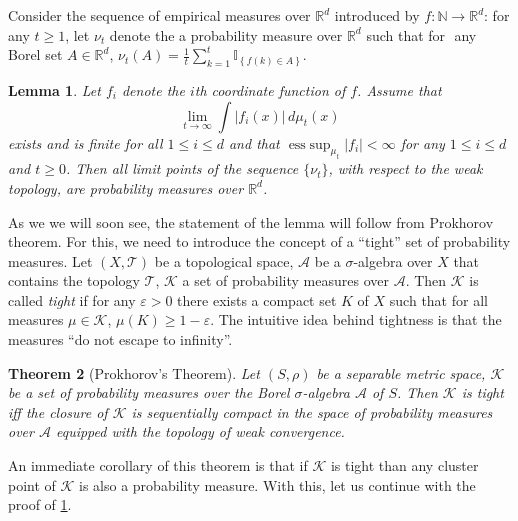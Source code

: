 \documentclass[english]{article} %
\DeclareMathOperator{\esssup}{ess\;sup}
\newcommand{\ind}[1]{\mathbb{I}_{\left\{ #1 \right\}}}
\newcommand{\real}{\mathbb{R}}
\renewcommand{\natural}{\mathbb{N}}
\newtheorem{lemma}{Lemma}[section]
\newtheorem{thm}[lemma]{Theorem}
\theoremstyle{definition}
\begin{document}
Consider the sequence of empirical measures over $\real^d$ introduced by $f:\natural \rightarrow \real^d$: for any $t\ge 1$, let $\nu_t$ denote the a probability measure over $\real^d$ such that
for $ $ any Borel set $A \in \real^d$, $\nu_t(A)=\tfrac{1}{t} \sum_{k=1}^t \ind{f(k) \in A}$. 
\fi

\begin{lemma}
\label{lem:nicefunction}
Let $f_i$ denote the $i$th coordinate function of $f$.
Assume that
\begin{equation}
\label{eq:niceproperty}
\lim_{t\to\infty} \int |f_i(x)|\, d\mu_t(x) 
\end{equation}
exists and is finite for all $1 \le i \le d$ and that $\esssup_{\mu_t} |f_i|<\infty$ for any $1\le i \le d$ and $t\ge 0$.
Then all limit points of the sequence $\{\nu_t\}$, with respect to the weak topology, are probability measures over $\real^d$.
\end{lemma}
\newcommand{\TT}{\mathcal{T}}
\renewcommand{\AA}{\mathcal{A}}
\newcommand{\KK}{\mathcal{K}}
\newcommand{\eps}{\varepsilon}
As we we will soon see, the statement of the lemma will follow from Prokhorov theorem.
For this, we need to introduce the concept of a ``tight'' set of probability measures.
Let $(X,\TT)$ be a topological space, $\AA$ be a $\sigma$-algebra over $X$ that contains the topology $\TT$,
$\KK$ a set of probability measures over $\AA$. Then $\KK$ is called \emph{tight} if for any $\eps>0$ there exists a compact set $K$ of $X$ such that for all measures $\mu \in \KK$, $\mu(K)\ge 1-\eps$. The intuitive idea behind tightness is that the measures ``do not escape to infinity''.
\begin{thm}[Prokhorov's Theorem]
Let $(S,\rho)$ be a separable metric space, $\KK$ be a set of probability measures over the Borel $\sigma$-algebra $\AA$ of $S$.
Then $\KK$ is tight iff the closure of $\KK$ is sequentially compact in the space of probability measures over $\AA$ equipped with the topology of weak convergence.
\end{thm}
An immediate corollary of this theorem is that if $\KK$ is tight than any cluster point of $\KK$ is also a probability measure.
With this, let us continue with the proof of \cref{lem:nicefunction}.
\end{document}
